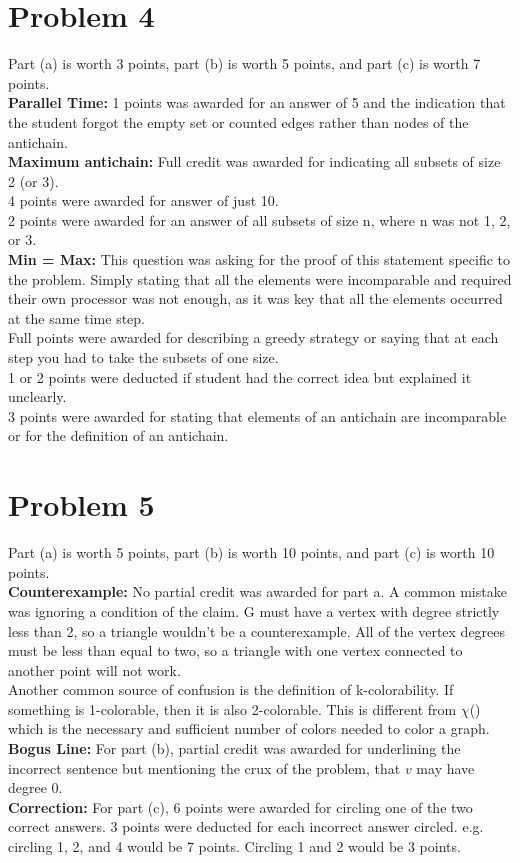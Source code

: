 \documentclass{article}
\begin{document}
\section*{Problem 4}
Part (a) is worth 3 points, part (b) is worth 5 points, and part (c) is worth 7 points. \\
\textbf{Parallel Time:} 1 points was awarded for an answer of 5 and the indication that the student forgot the empty set or counted edges rather than nodes of the antichain. \\
\textbf{Maximum antichain:} Full credit was awarded for indicating all subsets of size 2 (or 3). \\
4 points were awarded for answer of just 10.  \\
2 points were awarded for an answer of all subsets of size n, where n was not 1, 2, or 3. \\
\textbf{Min = Max:} This question was asking for the proof of this statement specific to the problem. Simply stating that all the elements were incomparable and required their own processor was not enough, as it was key that all the elements occurred at the same time step. \\
Full points were awarded for describing a greedy strategy or saying that at each step you had to take the subsets of one size.\\
1 or 2 points were deducted if student had the correct idea but explained it unclearly. \\
3 points were awarded for stating that elements of an antichain are incomparable or for the definition of an antichain. 

\section*{Problem 5}
Part (a) is worth 5 points, part (b) is worth 10 points, and part (c) is worth 10 points. \\
\textbf{Counterexample:} No partial credit was awarded for part a. A common mistake was ignoring a condition of the claim. G must have a vertex with degree strictly less than 2, so a triangle wouldn't be a counterexample. All of the vertex degrees must be less than equal to two, so a triangle with one vertex connected to another point will not work. \\
Another common source of confusion is the definition of k-colorability. If something is 1-colorable, then it is also 2-colorable. This is different from $\chi$() which is the necessary and sufficient number of colors needed to color a graph. \\
\textbf{Bogus Line:} For part (b), partial credit was awarded for underlining the incorrect sentence but mentioning the crux of the problem, that $v$ may have degree 0. \\
\textbf{Correction:} For part (c), 6 points were awarded for circling one of the two correct answers. 3 points were deducted for each incorrect answer circled. e.g. circling 1, 2, and 4 would be 7 points. Circling 1 and 2 would be 3 points. 
\end{document}
